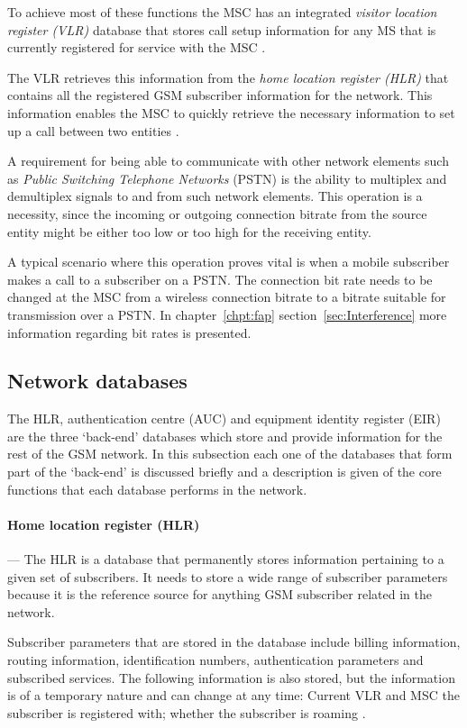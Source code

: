 To achieve most of these functions the MSC has an integrated \emph{visitor location register (VLR)} database that stores call setup information for any MS that is currently registered for service with the MSC \cite{GSM92,wirelesstelcoMullet}. 

The VLR retrieves this information from the \emph{home location register (HLR)} that contains all the registered GSM subscriber information for the network. This information enables the MSC to quickly retrieve the necessary information to set up a call between two entities \cite{GSMSysEngin,GSMSecurInTeleNetwork}.

A requirement for being able to communicate with other network elements such as \emph{Public Switching Telephone Networks} (PSTN) is the ability to multiplex and demultiplex signals to and from such network elements. This operation is a necessity, since the incoming or outgoing connection bitrate from the source entity might be either too low or too high for the receiving entity.

A typical scenario where this operation proves vital is when a mobile subscriber makes a call to a subscriber on a PSTN\@. The connection bit rate needs to be changed at the MSC from a wireless connection bitrate to a bitrate suitable for transmission over a PSTN\@. In chapter~\ref{chpt:fap} section~\ref{sec:Interference} more information regarding bit rates is presented.

\subsection{Network databases}
The HLR, authentication centre (AUC) and equipment identity register (EIR) are the three `back-end' databases which store and provide information for the rest of the GSM network. In this subsection each one of the databases that form part of the `back-end' is discussed briefly and a description is given of the core functions that each database performs in the network.

\paragraph{Home location register (HLR)}
--- The HLR is a database that permanently stores information pertaining to a given set of subscribers. It needs to store a wide range of subscriber parameters because it is the reference source for anything GSM subscriber related in the network. 

Subscriber parameters that are stored in the database include billing information, routing information, identification numbers, authentication parameters and subscribed services. The following information is also stored, but the information is of a temporary nature and can change at any time: Current VLR and MSC the subscriber is registered with; whether the subscriber is roaming \cite{GSMSysEngin}.

